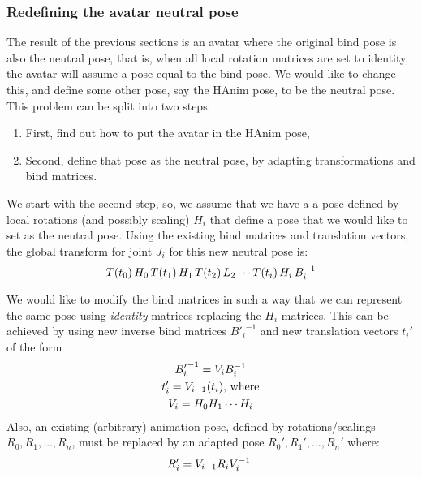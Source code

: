 \subsubsection{Redefining the avatar neutral pose}

The result of the previous sections is an avatar where the original bind pose is also the neutral pose,
that is, when all local rotation matrices are set to identity, the avatar will assume a pose equal to
the bind pose. We would like to change this, and define some other pose, say the HAnim pose,
to be the neutral pose.
This problem can be split into two steps:
\begin{enumerate}
\item First, find out how to put the avatar in the HAnim pose,
\item Second, define that pose as the neutral pose, by adapting transformations and bind matrices.
\end{enumerate}
%
We start with the second step, so, we assume that we have a a pose defined by local rotations (and possibly scaling) $H_i$
that define a pose that we would like to set as the neutral pose.
Using the existing bind matrices and translation vectors, the global transform for joint $J_i$ for this new neutral pose is:
%
\begin{equation}
T(t_0)\,H_0\,T(t_1)\,H_1\,T(t_2)\, L_2\cdots T(t_i)\,H_i\,B_i^{-1}\notag
\end{equation}
%

We would like to modify the bind matrices in such a way that we can represent the same pose using \emph{identity}
matrices replacing the $H_i$ matrices.
This can be achieved by using new inverse bind matrices ${B'_i}^{-1}$ and new translation vectors $t_i'$ of the form
\begin{gather}
{B'_i}^{-1} = V_i B_i^{-1} \notag\\
t_i' = V_{i-1}(t_i) \textrm{, where} \notag \\
V_i = H_0 H_1 \cdots H_i\notag\\
\end{gather}
%
Also, an existing (arbitrary) animation pose, defined by rotations/scalings \\
$R_0, R_1, \ldots , R_n$, must be replaced by an adapted pose $R_0', R_1', \ldots, R_n'$ where:
 \[R_i' = V_{i-1} R_i V_i^{-1} \notag.\]


